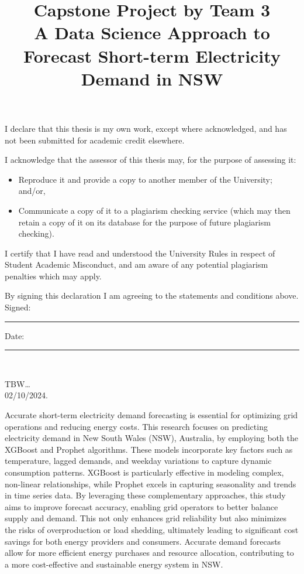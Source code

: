 \documentclass[mstat,12pt]{unswthesis}
\title{Capstone Project by Team 3\\[0.5cm]A Data Science Approach to
Forecast Short-term Electricity Demand in NSW}
\author{\Authornameonly}
\begin{document}
\beforepreface




\vskip 2pc \noindent I declare that this thesis is my
own work, except where acknowledged, and has not been submitted for
academic credit elsewhere. 

\vskip 2pc  \noindent I acknowledge that the assessor of this
thesis may, for the purpose of assessing it:
\begin{itemize}
\item Reproduce it and provide a copy to another member of the University; and/or,
\item Communicate a copy of it to a plagiarism checking service (which may then retain a copy of it on its database for the purpose of future plagiarism checking).
\end{itemize}

\vskip 2pc \noindent I certify that I have read and understood the University Rules in
respect of Student Academic Misconduct, and am aware of any potential plagiarism penalties which may 
apply.\vspace{24pt}

\vskip 2pc \noindent By signing 
this declaration I am
agreeing to the statements and conditions above.
\vskip 2pc \noindent
Signed: \rule{7cm}{0.25pt} \hfill Date: \rule{4cm}{0.25pt} \\[1cm]
\vskip 1pc





{\bigskip}TBW\ldots{}\\[1cm] 

{\bigskip\bigskip\bigskip\noindent} 02/10/2024.




Accurate short-term electricity demand forecasting is essential for
optimizing grid operations and reducing energy costs. This research
focuses on predicting electricity demand in New South Wales (NSW),
Australia, by employing both the XGBoost and Prophet algorithms. These
models incorporate key factors such as temperature, lagged demands, and
weekday variations to capture dynamic consumption patterns. XGBoost is
particularly effective in modeling complex, non-linear relationships,
while Prophet excels in capturing seasonality and trends in time series
data. By leveraging these complementary approaches, this study aims to
improve forecast accuracy, enabling grid operators to better balance
supply and demand. This not only enhances grid reliability but also
minimizes the risks of overproduction or load shedding, ultimately
leading to significant cost savings for both energy providers and
consumers. Accurate demand forecasts allow for more efficient energy
purchases and resource allocation, contributing to a more cost-effective
and sustainable energy system in NSW.
\end{document}

